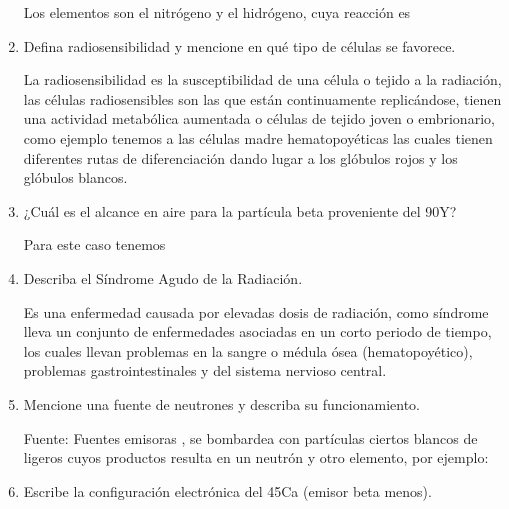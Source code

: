\begin{enumerate}
Los elementos son  el nitrógeno y el hidrógeno, cuya reacción es





  \item Defina radiosensibilidad y mencione en qué tipo de células se favorece.
  
La radiosensibilidad es la susceptibilidad de una célula o tejido a la radiación, las células radiosensibles son las que están continuamente replicándose, tienen una actividad metabólica aumentada o células de tejido joven o embrionario, como ejemplo tenemos a las células madre hematopoyéticas las cuales tienen diferentes rutas de diferenciación dando lugar a los glóbulos rojos y los glóbulos blancos.


  \item ¿Cuál es el alcance en aire para la partícula beta proveniente del 90Y?
  
  
Para este caso tenemos 



  \item Describa el Síndrome Agudo de la Radiación.
  
Es una enfermedad causada por elevadas dosis de radiación, como síndrome lleva un conjunto de enfermedades asociadas en un corto periodo de tiempo, los cuales llevan problemas en la sangre o médula ósea (hematopoyético), problemas gastrointestinales y del sistema nervioso central.


  \item Mencione una fuente de neutrones y describa su funcionamiento.
  

  Fuente: Fuentes emisoras \ec{\alpha}, se bombardea con partículas ciertos blancos de ligeros cuyos productos resulta en un neutrón y otro elemento, por ejemplo:



  \item Escribe la configuración electrónica del 45Ca (emisor beta menos).
  

\end{enumerate}
